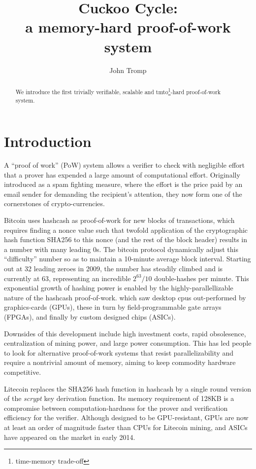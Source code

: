 \documentclass[11pt, oneside]{article}
\title{Cuckoo Cycle: \protect\\ a memory-hard proof-of-work system}
\author{John Tromp}
\begin{document}
\maketitle

\begin{abstract}
We introduce the first trivially verifiable, scalable and tmto\footnote{time-memory trade-off}-hard proof-of-work system.
\end{abstract}

\section{Introduction}
A ``proof of work'' (PoW) system allows a verifier to check with
negligible effort that a prover has expended a large amount of computational effort.
Originally introduced as a spam fighting measure, 
where the effort is the price paid by an email sender for demanding the recipient's attention,
they now form one of the cornerstones of crypto-currencies.

Bitcoin\cite{nakamoto2009bitcoin} uses hashcash\cite{back2002} as proof-of-work for
new blocks of transactions, which requires finding a nonce value such that
twofold application of the cryptographic hash function SHA256
to this nonce (and the rest of the block header) results in a number with many
leading 0s.  The bitcoin protocol dynamically adjust this ``difficulty'' number
so as to maintain a 10-minute average block interval. Starting out at 32 leading zeroes in 2009,
the number has steadily climbed and is currently at 63, representing
an incredible $2^{63}/10$ double-hashes per minute. This exponential growth of hashing power
is enabled by the highly-parallellizable nature of the hashcash proof-of-work.
which saw desktop cpus out-performed by graphics-cards (GPUs),
these in turn by field-programmable gate arrays (FPGAs),
and finally by custom designed chips (ASICs).

Downsides of this development include high investment costs, rapid obsolesence,
centralization of mining power, and large power consumption.
This has led people to look for alternative proof-of-work systems that resist parallelizability
and require a nontrivial amount of memory, aiming to keep commodity hardware competitive.

Litecoin replaces the SHA256 hash function in hashcash by a single round version of the
{\em scrypt} key derivation function. Its memory requirement of 128KB is a compromise
between computation-hardness for the prover and verification efficiency for the verifier.
Although designed to be GPU-resistant, GPUs are now at least an order of magnitude faster
than CPUs for Litecoin mining, and ASICs have appeared on the market in early 2014.
\end{document}
